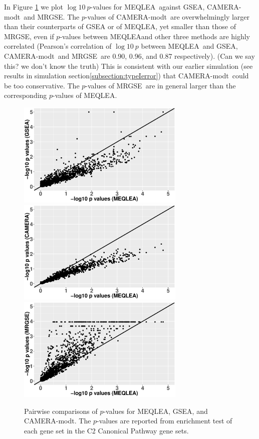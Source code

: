 \documentclass[a4,center,fleqn]{NAR}
\newcommand{\OurMethod}{MEQLEA}
\newcommand{\CMT}{CAMERA-modt}
\newcommand{\genr}{MRGSE}
\begin{document}
	In Figure \ref{fig:HDdatap} we plot $\log 10~p$-values for \OurMethod~against GSEA, \CMT~and \genr.
	The $p$-values of \CMT~are overwhelmingly larger than their counterparts of GSEA or of \OurMethod, yet 
	smaller than those of \genr, even 
	if $p$-values between \OurMethod and other three methods are highly correlated (Pearson's correlation 
	of $\log 10 ~p$ between \OurMethod~and GSEA, \CMT~and \genr~are 0.90, 0.96, and 0.87 respectively). 
	(Can we say this? we don't know the truth) This is consistent with our earlier simulation (see results in simulation 
	section\ref{subsection:typeIerror}) that
	\CMT~could be too conservative. The $p$-values of \genr~are in general larger than the corresponding
	$p$-values of \OurMethod. 
	\begin{figure}[!ht]
		\begin{center}
			\includegraphics[width=8cm,height=5cm]{Figures/MEQLEA_GSEA.eps}
			\includegraphics[width=8cm,height=5cm]{Figures/MEQLEA_Camera.eps}
			\includegraphics[width=8cm,height=5cm]{Figures/MEQLEA_MRGSE.eps}
		\end{center} 
		\caption{Pairwise comparisons of $p$-values for \OurMethod, GSEA, and \CMT. The $p$-values are
			reported from enrichment test of each gene set in the C2 Canonical Pathway gene sets.
		}\label{fig:HDdatap}
	\end{figure} 
	
\end{document}
